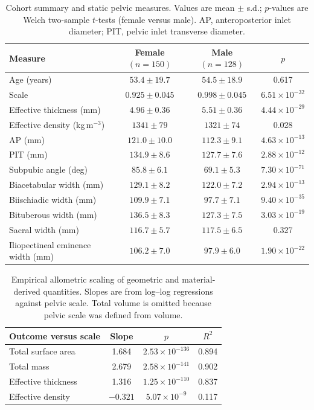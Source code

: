 \documentclass[openacc]{rsproca_new}
\begin{document}
\begin{table}[p]
\centering
\caption{Cohort summary and static pelvic measures. Values are mean $\pm$ s.d.; $p$-values are Welch two-sample $t$-tests (female versus male). AP, anteroposterior inlet diameter; PIT, pelvic inlet transverse diameter.}
\label{tab:cohort}
\begin{tabular}{lccc}
\toprule
Measure & Female $(n=150)$ & Male $(n=128)$ & $p$ \\
\midrule
Age (years) & $53.4 \pm 19.7$ & $54.5 \pm 18.9$ & 0.617 \\
Scale & $0.925 \pm 0.045$ & $0.998 \pm 0.045$ & $6.51 \times 10^{-32}$ \\
Effective thickness (mm) & $4.96 \pm 0.36$ & $5.51 \pm 0.36$ & $4.44 \times 10^{-29}$ \\
Effective density (kg\,m$^{-3}$) & $1341 \pm 79$ & $1321 \pm 74$ & 0.028 \\
AP (mm) & $121.0 \pm 10.0$ & $112.3 \pm 9.1$ & $4.63 \times 10^{-13}$ \\
PIT (mm) & $134.9 \pm 8.6$ & $127.7 \pm 7.6$ & $2.88 \times 10^{-12}$ \\
Subpubic angle (deg) & $85.8 \pm 6.1$ & $69.1 \pm 5.3$ & $7.30 \times 10^{-71}$ \\
Biacetabular width (mm) & $129.1 \pm 8.2$ & $122.0 \pm 7.2$ & $2.94 \times 10^{-13}$ \\
Biischiadic width (mm) & $109.9 \pm 7.1$ & $97.7 \pm 7.1$ & $9.40 \times 10^{-35}$ \\
Bituberous width (mm) & $136.5 \pm 8.3$ & $127.3 \pm 7.5$ & $3.03 \times 10^{-19}$ \\
Sacral width (mm) & $116.7 \pm 5.7$ & $117.5 \pm 6.5$ & 0.327 \\
Iliopectineal eminence width (mm) & $106.2 \pm 7.0$ & $97.9 \pm 6.0$ & $1.90 \times 10^{-22}$ \\
\bottomrule
\end{tabular}
\end{table}

\begin{table}[p]
\centering
\caption{Empirical allometric scaling of geometric and material-derived quantities. Slopes are from log--log regressions against pelvic scale. Total volume is omitted because pelvic scale was defined from volume.}
\label{tab:allometry}
\begin{tabular}{lccc}
\toprule
Outcome versus scale & Slope & $p$ & $R^2$ \\
\midrule
Total surface area & 1.684 & $2.53 \times 10^{-136}$ & 0.894 \\
Total mass & 2.679 & $2.58 \times 10^{-141}$ & 0.902 \\
Effective thickness & 1.316 & $1.25 \times 10^{-110}$ & 0.837 \\
Effective density & $-0.321$ & $5.07 \times 10^{-9}$ & 0.117 \\
\bottomrule
\end{tabular}
\end{table}
\end{document}
